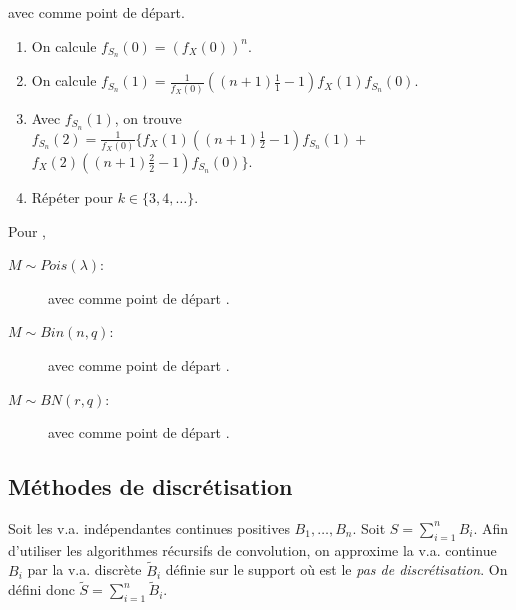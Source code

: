 \documentclass[10pt, french]{article}
\begin{document}
\begin{multicols*}{2}
\begin{algo2}
avec  comme point de départ.

\tcbline

\begin{enumerate}
	\item	On calcule $f_{S_{n}}(0)	=	\left(f_{X}(0)\right)^{n}$.
	\item	On calcule $f_{S_{n}}(1)	=	\frac{1}{f_{X}(0)} \left((n + 1)\frac{1}{1} - 1\right)f_{X}(1)f_{S_{n}}(0)$.
	\item	Avec $f_{S_{n}}(1)$, on trouve $f_{S_{n}}(2)	=	\frac{1}{f_{X}(0)} \bigg\{ f_{X}(1)\left((n + 1)\frac{1}{2} - 1\right)f_{S_{n}}(1)	+$ $ f_{X}(2)\left((n + 1)\frac{2}{2} - 1\right)f_{S_{n}}(0) \bigg\}$.
	\item	Répéter pour $k \in \{3, 4, \dots\}$.
\end{enumerate}
\end{algo2}

Pour , 
\begin{description}
	\item[$M \sim Pois(\lambda)$:]	 avec comme point de départ .
	\item[$M \sim Bin(n, q)$:]	 avec comme point de départ .
	\item[$M \sim BN(r, q)$:]	 avec comme point de départ .
\end{description}


\columnbreak
\subsection{Méthodes de discrétisation}
Soit les v.a. indépendantes continues positives $B_{1}, \dots, B_{n}$.
Soit $S	=	\sum_{i	=	1}^{n}B_{i}$.
Afin d'utiliser les algorithmes récursifs de convolution, on approxime la v.a. continue $B_{i}$ par la v.a. discrète $\tilde{B}_{i}$ définie sur le support  où  est le \textit{pas de discrétisation}.
On défini donc $\tilde{S}	=	\sum_{i	=	1}^{n}\tilde{B}_{i}$.


\end{multicols*}
\end{document}
